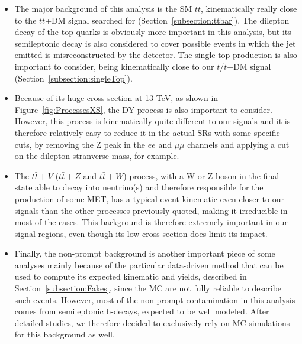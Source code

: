 \documentclass[a4paper, 10pt, openright]{report}
\begin{document}
\begin{itemize}
\item The major background of this analysis is the \ac{SM} $t \bar t$, kinematically really close to the $t \bar t$+DM signal searched for (Section~\ref{subsection:ttbar}). The dilepton decay of the top quarks is obviously more important in this analysis, but its semileptonic decay is also considered to cover possible events in which the jet emitted is misreconstructed by the detector. The single top production is also important to consider, being kinematically close to our $t/\bar t$+DM signal (Section~\ref{subsection:singleTop}).
\item Because of its huge cross section at 13 TeV, as shown in Figure~\ref{fig:ProcessesXS}, the \ac{DY} process is also important to consider. However, this process is kinematically quite different to our signals and it is therefore relatively easy to reduce it in the actual \acp{SR} with some specific cuts, by removing the Z peak in the $ee$ and $\mu \mu$ channels and applying a cut on the dilepton stranverse mass, for example.%
\item The $t \bar t + V$ ($t \bar t + Z$ and $t \bar t + W$) process, with a W or Z boson in the final state able to decay into neutrino(s) and therefore responsible for the production of some \ac{MET}, has a typical event kinematic even closer to our signals than the other processes previously quoted, making it irreducible in most of the cases. This background is therefore extremely important in our signal regions, even though its low cross section does limit its impact.%
\item Finally, the non-prompt background is another important piece of some analyses mainly because of the particular data-driven method that can be used to compute its expected kinematic and yields, described in Section~\ref{subsection:Fakes}, since the \ac{MC} are not fully reliable to describe such events. However, most of the non-prompt contamination in this analysis comes from semileptonic b-decays, expected to be well modeled. After detailed studies, we therefore decided to exclusively rely on \ac{MC} simulations for this background as well. 
\end{itemize}
\end{document}
